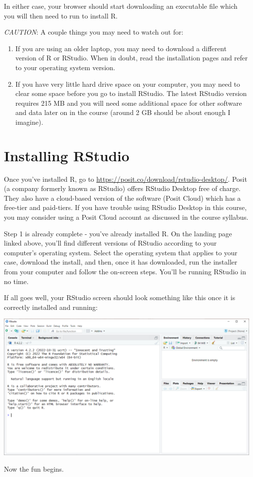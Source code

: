 \documentclass[
]{book}
\begin{document}
In either case, your browser should start downloading an executable file which you will then need to run to install R.

\emph{CAUTION}: A couple things you may need to watch out for:

\begin{enumerate}
\def\labelenumi{\arabic{enumi}.}
\item
  If you are using an older laptop, you may need to download a different version of R or RStudio. When in doubt, read the installation pages and refer to your operating system version.
\item
  If you have very little hard drive space on your computer, you may need to clear some space before you go to install RStudio. The latest RStudio version requires 215 MB and you will need some additional space for other software and data later on in the course (around 2 GB should be about enough I imagine).
\end{enumerate}

\hypertarget{installing-rstudio}{%
\section{Installing RStudio}\label{installing-rstudio}}

Once you've installed R, go to \url{https://posit.co/download/rstudio-desktop/}. Posit (a company formerly known as RStudio) offers RStudio Desktop free of charge. They also have a cloud-based version of the software (Posit Cloud) which has a free-tier and paid-tiers. If you have trouble using RStudio Desktop in this course, you may consider using a Posit Cloud account as discussed in the course syllabus.

Step 1 is already complete - you've already installed R. On the landing page linked above, you'll find different versions of RStudio according to your computer's operating system. Select the operating system that applies to your case, download the install, and then, once it has downloaded, run the installer from your computer and follow the on-screen steps. You'll be running RStudio in no time.

If all goes well, your RStudio screen should look something like this once it is correctly installed and running:

\includegraphics{docs/_main_files/figure-html/RStudio clean install.png}

Now the fun begins.

  
\end{document}
